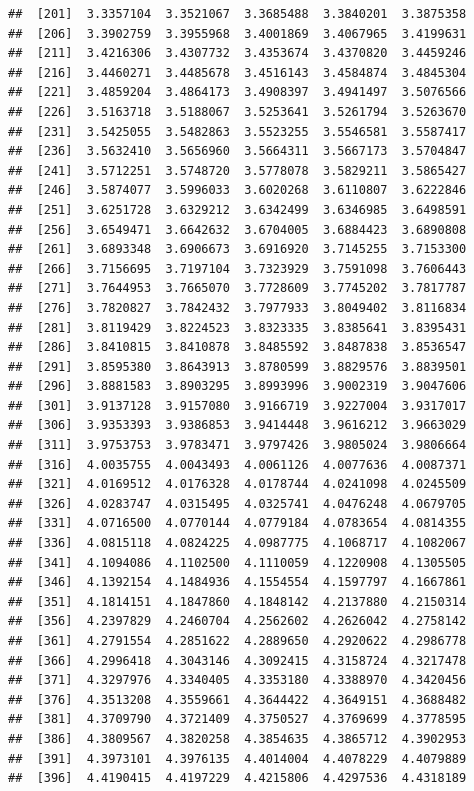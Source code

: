 \documentclass[
  11pt]{report}
\begin{document}
\begin{itemize}
\begin{verbatim}
##  [201]  3.3357104  3.3521067  3.3685488  3.3840201  3.3875358
##  [206]  3.3902759  3.3955968  3.4001869  3.4067965  3.4199631
##  [211]  3.4216306  3.4307732  3.4353674  3.4370820  3.4459246
##  [216]  3.4460271  3.4485678  3.4516143  3.4584874  3.4845304
##  [221]  3.4859204  3.4864173  3.4908397  3.4941497  3.5076566
##  [226]  3.5163718  3.5188067  3.5253641  3.5261794  3.5263670
##  [231]  3.5425055  3.5482863  3.5523255  3.5546581  3.5587417
##  [236]  3.5632410  3.5656960  3.5664311  3.5667173  3.5704847
##  [241]  3.5712251  3.5748720  3.5778078  3.5829211  3.5865427
##  [246]  3.5874077  3.5996033  3.6020268  3.6110807  3.6222846
##  [251]  3.6251728  3.6329212  3.6342499  3.6346985  3.6498591
##  [256]  3.6549471  3.6642632  3.6704005  3.6884423  3.6890808
##  [261]  3.6893348  3.6906673  3.6916920  3.7145255  3.7153300
##  [266]  3.7156695  3.7197104  3.7323929  3.7591098  3.7606443
##  [271]  3.7644953  3.7665070  3.7728609  3.7745202  3.7817787
##  [276]  3.7820827  3.7842432  3.7977933  3.8049402  3.8116834
##  [281]  3.8119429  3.8224523  3.8323335  3.8385641  3.8395431
##  [286]  3.8410815  3.8410878  3.8485592  3.8487838  3.8536547
##  [291]  3.8595380  3.8643913  3.8780599  3.8829576  3.8839501
##  [296]  3.8881583  3.8903295  3.8993996  3.9002319  3.9047606
##  [301]  3.9137128  3.9157080  3.9166719  3.9227004  3.9317017
##  [306]  3.9353393  3.9386853  3.9414448  3.9616212  3.9663029
##  [311]  3.9753753  3.9783471  3.9797426  3.9805024  3.9806664
##  [316]  4.0035755  4.0043493  4.0061126  4.0077636  4.0087371
##  [321]  4.0169512  4.0176328  4.0178744  4.0241098  4.0245509
##  [326]  4.0283747  4.0315495  4.0325741  4.0476248  4.0679705
##  [331]  4.0716500  4.0770144  4.0779184  4.0783654  4.0814355
##  [336]  4.0815118  4.0824225  4.0987775  4.1068717  4.1082067
##  [341]  4.1094086  4.1102500  4.1110059  4.1220908  4.1305505
##  [346]  4.1392154  4.1484936  4.1554554  4.1597797  4.1667861
##  [351]  4.1814151  4.1847860  4.1848142  4.2137880  4.2150314
##  [356]  4.2397829  4.2460704  4.2562602  4.2626042  4.2758142
##  [361]  4.2791554  4.2851622  4.2889650  4.2920622  4.2986778
##  [366]  4.2996418  4.3043146  4.3092415  4.3158724  4.3217478
##  [371]  4.3297976  4.3340405  4.3353180  4.3388970  4.3420456
##  [376]  4.3513208  4.3559661  4.3644422  4.3649151  4.3688482
##  [381]  4.3709790  4.3721409  4.3750527  4.3769699  4.3778595
##  [386]  4.3809567  4.3820258  4.3854635  4.3865712  4.3902953
##  [391]  4.3973101  4.3976135  4.4014004  4.4078229  4.4079889
##  [396]  4.4190415  4.4197229  4.4215806  4.4297536  4.4318189

\end{verbatim}
\end{itemize}
\end{document}
